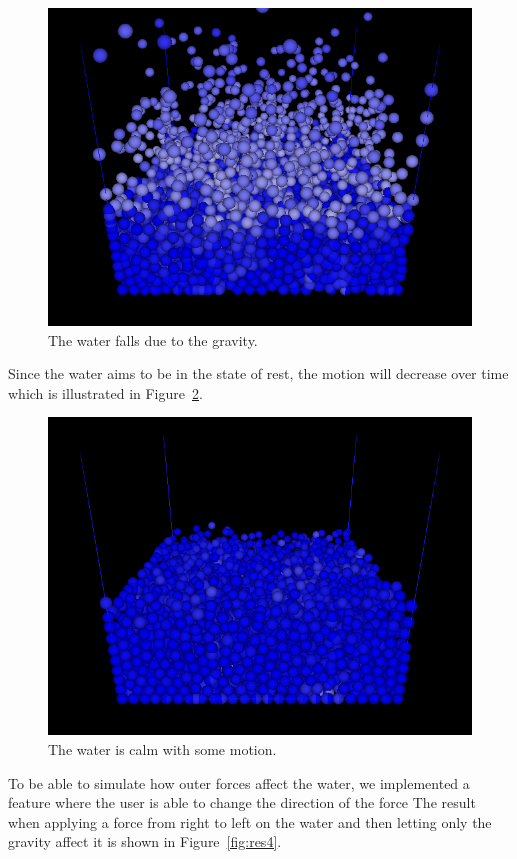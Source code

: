 	\begin{figure}[h!]
		\includegraphics[width=\linewidth]{img/frame0139.png}
		\caption{The water falls due to the gravity.}
		\label{fig:res2}
	\end{figure}

	Since the water aims to be in the state of rest, the motion will decrease over time which is illustrated in Figure~\ref{fig:res3}.
	\begin{figure}[h!]
		\includegraphics[width=\linewidth]{img/frame0500.png}
		\caption{The water is calm with some motion.}
		\label{fig:res3}
	\end{figure}

	To be able to simulate how outer forces affect the water, we implemented a feature where the user is able to change the direction of the force
	The result when applying a force from right to left on the water and then letting only the gravity affect it is shown in Figure~\ref{fig:res4}.

